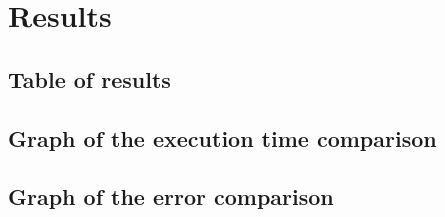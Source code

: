 \section{Results}\label{results}

\subsection{Table of results}
	

\subsection{Graph of the execution time comparison}

	

\subsection{Graph of the error comparison}



\pagebreak